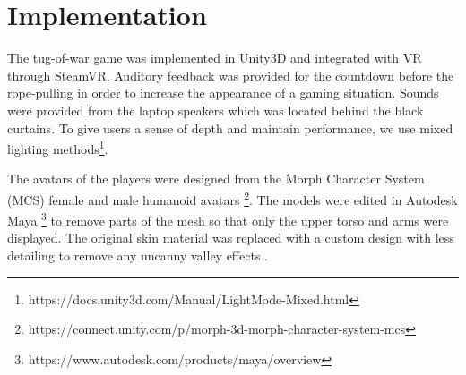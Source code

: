
\section{Implementation}
\label{section:implementation}
The tug-of-war game was implemented in Unity3D and integrated with VR through SteamVR. Auditory feedback was provided for the countdown before the rope-pulling in order to increase the appearance of a gaming situation. Sounds were provided from the laptop speakers which was located behind the black curtains. 
To give users a sense of depth and maintain performance, we use mixed lighting methods\footnote{https://docs.unity3d.com/Manual/LightMode-Mixed.html}.

The avatars of the players were designed from the Morph Character System (MCS) female and male humanoid avatars  \footnote{https://connect.unity.com/p/morph-3d-morph-character-system-mcs}. The models were edited in Autodesk Maya \footnote{https://www.autodesk.com/products/maya/overview} to remove parts of the mesh so that only the upper torso and arms were displayed. The original skin material was replaced with a custom design with less detailing to remove any uncanny valley effects \cite{geller2008overcoming}. 

